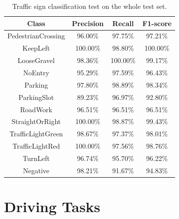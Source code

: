 \begin{table}[h]
  \begin{center}
    \caption{Traffic sign classification test on the whole test set.}
    \label{table:classification-metrics2}
    \begin{tabular}{|c|c|c|c|}
      \hline
      \textbf{Class}     & \textbf{Precision} & \textbf{Recall}  & \textbf{F1-score} \\
      \hline
      PedestrianCrossing & 96.00\%            & 97.75\%          & 97.21\% \\
      \hline
      KeepLeft           & 100.00\%           & 98.80\%          & 100.00\% \\
      \hline
      LooseGravel        & 98.36\%            & 100.00\%         & 99.17\% \\
      \hline
      NoEntry            & 95.29\%            & 97.59\%          & 96.43\% \\
      \hline
      Parking            & 97.80\%            & 98.89\%          & 98.34\% \\
      \hline
      ParkingSlot        & 89.23\%            & 96.97\%          & 92.80\%  \\
      \hline
      RoadWork           & 96.51\%            & 96.51\%          & 96.51\% \\
      \hline
      StraightOrRight    & 100.00\%           & 98.87\%          & 99.43\%  \\
      \hline
      TrafficLightGreen  & 98.67\%            & 97.37\%          & 98.01\%  \\
      \hline
      TrafficLightRed    & 100.00\%           & 97.56\%          & 98.76\%  \\
      \hline
      TurnLeft           & 96.74\%            & 95.70\%          & 96.22\%  \\
      \hline
      Negative           & 98.21\%            & 91.67\%          & 94.83\%  \\
      \hline
    \end{tabular}
  \end{center}
\end{table}

\section{Driving Tasks}

